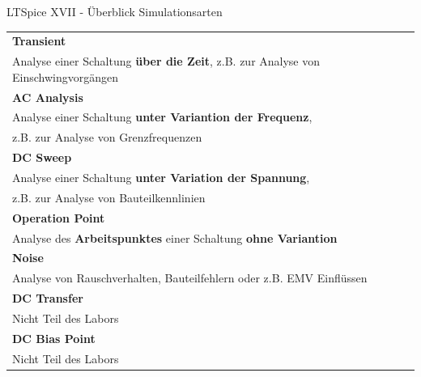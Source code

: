 \documentclass{beamer}
\begin{document}
  \begin{frame}{LTSpice XVII - Überblick Simulationsarten}

    \begin{scriptsize}
    \begin{tabular}{ l }
      \hline
      \textbf{Transient}\\
      Analyse einer Schaltung \textbf{über die Zeit}, z.B. zur Analyse von Einschwingvorgängen\\
      \hline
      \textbf{AC Analysis}\\
      Analyse einer Schaltung \textbf{unter Variantion der Frequenz},\\ z.B. zur Analyse von Grenzfrequenzen\\
      \hline
      \textbf{DC Sweep}\\
      Analyse einer Schaltung \textbf{unter Variation der Spannung},\\ z.B. zur Analyse von Bauteilkennlinien\\
      \hline
      \textbf{Operation Point}\\
      Analyse des \textbf{Arbeitspunktes} einer Schaltung \textbf{ohne Variantion}\\
      \hline
      \textbf{Noise}\\
      Analyse von Rauschverhalten, Bauteilfehlern oder z.B. EMV Einflüssen\\
      \hline
      \textbf{DC Transfer}\\
      Nicht Teil des Labors\\
      \hline
      \textbf{DC Bias Point}\\
      Nicht Teil des Labors\\
      \hline
    \end{tabular}
    \end{scriptsize} 
    
  \end{frame}
  
\end{document}
